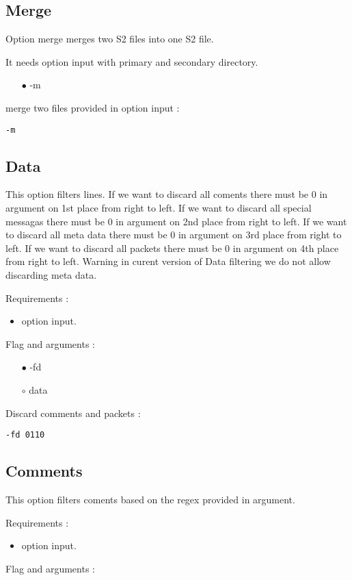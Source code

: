 \documentclass[english]{article}
\begin{document}
\subsection{Merge}
Option merge merges two S2 files into one S2 file. 

It needs option input with primary and secondary directory.
\begin{itemize}
 \item[$\bullet$] -m
 \end{itemize}
merge two files provided in option input : \begin{lstlisting} 
-m
\end{lstlisting}


\subsection{Data}
This option filters lines. If we want to discard all coments there must be 0 in argument on 1st place from right to left. If we want to discard all special messagas there must be 0 in argument on 2nd place from right to left. If we want to discard all meta data there must be 0 in argument on 3rd place from right to left. If we want to discard all packets there must be 0 in argument on 4th place from right to left. Warning in curent version of Data filtering we do not allow discarding meta data. 

\noindent Requirements : 
\begin{itemize}
\item option input. 
\end{itemize}
Flag and arguments :
\begin{itemize}
\item[$\bullet$] -fd
\item[$\circ$] data
\end{itemize}
Discard comments and packets : 
\begin{lstlisting} 
-fd 0110
\end{lstlisting}


\subsection{Comments}
This option filters coments based on the regex provided in argument.

\noindent Requirements : 
\begin{itemize}
\item option input. 
\end{itemize}
Flag and arguments : 
\end{document}

